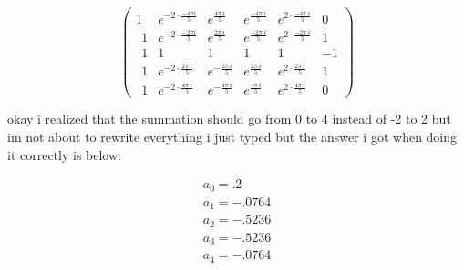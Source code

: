 \documentclass{article}
\begin{document}
\begin{enumerate}
\begin{align}
    \end{align}
    \begin{equation}
        \begin{pmatrix}1&e^{-2\cdot \frac{-4\pi i}{5}}&e^{\frac{4\pi \:i}{5}}&e^{\frac{-4\pi \:i}{5}}&e^{2\cdot \frac{-4\pi \:i}{5}}&0\\ \:\:1&e^{-2\cdot \frac{-2\pi i}{5}}&e^{\frac{2\pi \:i}{5}}&e^{\frac{-2\pi \:i}{5}}&e^{2\cdot \frac{-2\pi \:i}{5}}&1\\ \:\:1&1&1&1&1&-1\\ \:\:1&e^{-2\cdot \frac{2\pi \:i}{5}}&e^{-\frac{2\pi \:i}{5}}&e^{\frac{2\pi \:i}{5}}&e^{2\cdot \frac{2\pi \:i}{5}}&1\\ \:\:1&e^{-2\cdot \frac{4\pi \:i}{5}}&e^{-\frac{4\pi \:i}{5}}&e^{\frac{4\pi \:i}{5}}&e^{2\cdot \frac{4\pi \:i}{5}}&0\end{pmatrix}
    \end{equation}
    \begin{center}
        okay i realized that the summation should go from 0 to 4 instead of -2 to 2 but im not about to rewrite everything i just typed but the answer i got when doing it correctly is below:
    \end{center}
    \begin{align}
        a_{0} = .2\\
        a_{1} = -.0764\\
        a_{2} = -.5236\\
        a_{3} = -.5236\\
        a_{4} = -.0764\\
    \end{align}
\end{enumerate}
\end{document}
